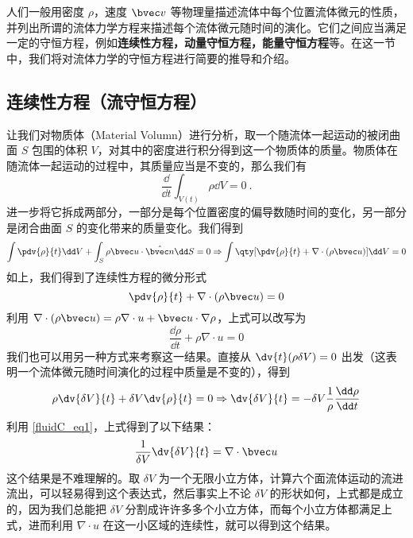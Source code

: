 

人们一般用密度 $\rho$，速度 $\bvec v$ 等物理量描述流体中每个位置流体微元的性质，并列出所谓的流体力学方程来描述每个流体微元随时间的演化。它们之间应当满足一定的守恒方程，例如\textbf{连续性方程，动量守恒方程，能量守恒方程}等。在这一节中，我们将对流体力学的守恒方程进行简要的推导和介绍。
\subsection{连续性方程（流守恒方程）}
让我们对物质体（Material Volumn）进行分析，取一个随流体一起运动的被闭曲面 $S$ 包围的体积 $V$，对其中的密度进行积分得到这一个物质体的质量。物质体在随流体一起运动的过程中，其质量应当是不变的，那么我们有
\begin{equation}
\frac{\dd}{\dd t}\int_{V(t)} \rho \dd V=0~.
\end{equation}
进一步将它拆成两部分，一部分是每个位置密度的偏导数随时间的变化，另一部分是闭合曲面 $S$ 的变化带来的质量变化。我们得到
\begin{equation}
\int \pdv{\rho}{t}\dd V+\int_S \rho \bvec u\cdot \hat{\bvec n}\dd S=0\Rightarrow \int \qty[\pdv{\rho}{t}+\nabla\cdot(\rho\bvec u)]\dd V=0
\end{equation}
如上，我们得到了连续性方程的微分形式
\begin{equation}\label{fluidC_eq6}
\pdv{\rho}{t}+\nabla\cdot(\rho\bvec u)=0
\end{equation}
利用 $\nabla\cdot (\rho\bvec u)=\rho \nabla\cdot u+\bvec u\cdot \nabla \rho$，上式可以改写为
\begin{equation}\label{fluidC_eq1}
\frac{\dd \rho}{\dd t}+\rho \nabla\cdot u=0
\end{equation}
我们也可以用另一种方式来考察这一结果。直接从 $\dv{t} (\rho \delta V)=0$ 出发（这表明一个流体微元随时间演化的过程中质量是不变的），得到
\begin{equation}
\rho \dv{\delta V}{t}+\delta V\dv{\rho}{t}=0\Rightarrow \dv{\delta V}{t}=-\delta V \frac{1}{\rho}\frac{\dd \rho}{\dd t}
\end{equation}
利用 \autoref{fluidC_eq1}，上式得到了以下结果：
\begin{equation}
\frac{1}{\delta V}\dv{\delta V}{t}=\nabla\cdot \bvec u
\end{equation}
这个结果是不难理解的。取 $\delta V$ 为一个无限小立方体，计算六个面流体运动的流进流出，可以轻易得到这个表达式，然后事实上不论 $\delta V$ 的形状如何，上式都是成立的，因为我们总能把 $\delta V$ 分割成许许多多个小立方体，而每个小立方体都满足上式，进而利用 $\nabla\cdot u$ 在这一小区域的连续性，就可以得到这个结果。
